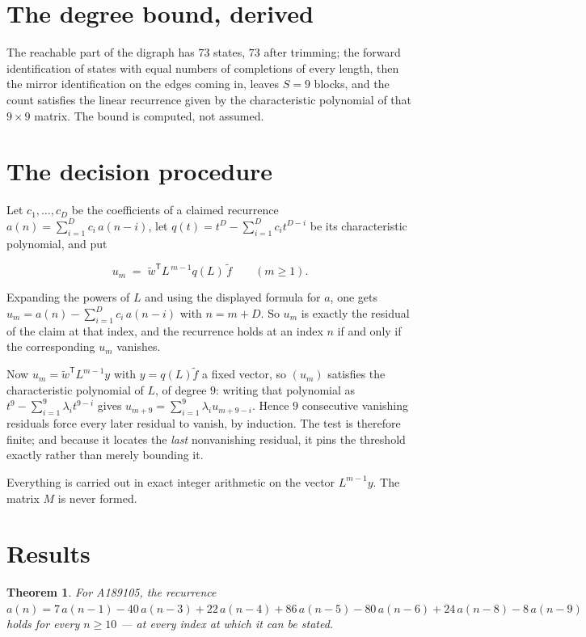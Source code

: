 \documentclass[11pt]{article}
\newtheorem{theorem}{Theorem}
\theoremstyle{definition}
\begin{document}
\section{The degree bound, derived}

The reachable part of the digraph has $73$ states, $73$ after trimming; the forward identification of states with equal numbers of completions of every length, then the mirror identification on the edges coming in, leaves $S = 9$ blocks, and the count satisfies the linear recurrence given by the characteristic polynomial of that $9\times9$ matrix. The bound is computed, not assumed.

\section{The decision procedure}

Let $c_1,\dots,c_D$ be the coefficients of a claimed recurrence $a(n) = \sum_{i=1}^{D} c_i\,a(n-i)$, let $q(t) = t^{D} - \sum_{i=1}^{D} c_i t^{D-i}$ be its characteristic polynomial, and put

\[u_m \;=\; \tilde w^{\mathsf T} L^{\,m-1} q(L)\,\tilde f \qquad (m \ge 1).\]

Expanding the powers of $L$ and using the displayed formula for $a$, one gets $u_m = a(n) - \sum_{i=1}^{D} c_i\,a(n-i)$ with $n = m + D$. So $u_m$ is exactly the residual of the claim at that index, and the recurrence holds at an index $n$ if and only if the corresponding $u_m$ vanishes.

Now $u_m = \tilde w^{\mathsf T} L^{m-1} y$ with $y = q(L)\tilde f$ a fixed vector, so $(u_m)$ satisfies the characteristic polynomial of $L$, of degree $9$: writing that polynomial as $t^{9} - \sum_{i=1}^{9} \lambda_i t^{9-i}$ gives $u_{m+9} = \sum_{i=1}^{9} \lambda_i u_{m+9-i}$. Hence $9$ consecutive vanishing residuals force every later residual to vanish, by induction. The test is therefore finite; and because it locates the {\itshape last} nonvanishing residual, it pins the threshold exactly rather than merely bounding it.

Everything is carried out in exact integer arithmetic on the vector $L^{m-1}y$. The matrix $M$ is never formed.

\section{Results}

\begin{theorem} For A189105, the recurrence $a(n) = 7\,a(n-1) - 40\,a(n-3) + 22\,a(n-4) + 86\,a(n-5) - 80\,a(n-6) + 24\,a(n-8) - 8\,a(n-9)$ holds for every $n \ge 10$ --- at every index at which it can be stated.\end{theorem}
\end{document}
